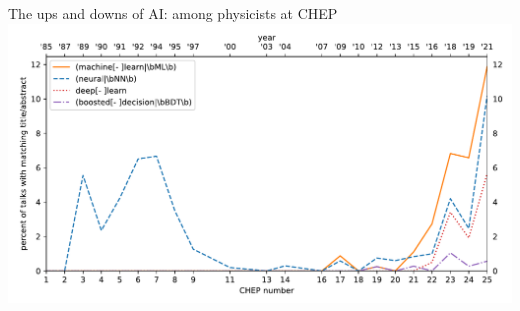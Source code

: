\documentclass[aspectratio=169]{beamer}
\begin{document}
\begin{frame}{The ups and downs of AI: among physicists at CHEP}
\vspace{0.25 cm}
\includegraphics[width=\linewidth]{img/chep-papers-ml.pdf}
\end{frame}
\end{document}
